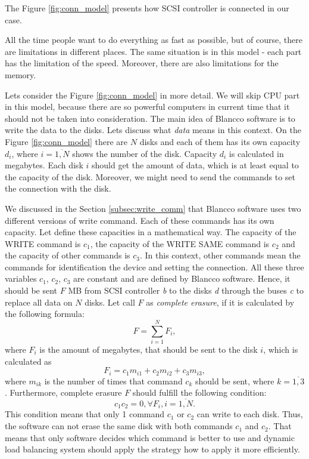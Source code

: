 The Figure \ref{fig:conn_model} presents how SCSI controller is connected in our case.  

All the time people want to do everything as fast as possible, but of course, there are limitations in different places. The same situation is in this model - each part has the limitation of the speed. Moreover, there are also limitations for the memory.


Lets consider the Figure \ref{fig:conn_model} in more detail. We will skip CPU part in this model, because there are so powerful computers in current time that it should not be taken into consideration. The main idea of Blancco software is to write the data to the disks. Lets discuss what \emph{data} means in this context. On the Figure \ref{fig:conn_model} there are $N$ disks and each of them has its own capacity $d_i$, where $i=\overline{1,N}$ shows the number of the disk. Capacity $d_i$ is calculated in megabytes. Each disk $i$ should get the amount of data, which is at least equal to the capacity of the disk. Moreover, we might need to send the commands to set the connection with the disk. 


We discussed in the Section \ref{subsec:write_comm} that Blancco software uses two different versions of write command. Each of these commands has its own capacity. Let define these capacities in a mathematical way. The capacity of the WRITE command is $c_1$, the capacity of the WRITE SAME command is $c_2$ and the capacity of other commands is $c_3$. In this context, other commands mean the commands for identification the device and setting the connection. All these three variables $c_1$, $c_2$, $c_3$ are constant and are defined by Blancco software. Hence, it should be sent $F$ MB from SCSI controller \emph{b} to the disks \emph{d} through the buses \emph{c} to replace all data on $N$ disks. Let call $F$ as \emph{complete erasure}, if it is calculated by the following formula:
\begin{equation}
\label{eq:comp_erasure}
	F = \sum_{i=1}^{N}F_i,
\end{equation}
where $F_i$ is the amount of megabytes, that should be sent to the disk $i$, which is calculated as
\begin{equation}
	F_i = c_1 m_{i1} + c_2 m_{i2} + c_3 m_{i3},
\end{equation}
where $m_{ik}$ is the number of times that command $c_k$ should be sent, where $k=\overline{1,3}$. Furthermore, complete erasure $F$ should fulfill the following condition:
\begin{equation}
\label{eq:write_cond}
	c_1 c_2 = 0, \forall F_i, i=\overline{1,N}.
\end{equation}
This condition means that only 1 command $c_1$ or $c_2$ can write to each disk. Thus, the software can not erase the same disk with both commands $c_1$ and $c_2$. That means that only software decides which command is better to use and dynamic load balancing system should apply the strategy how to apply it more efficiently.

